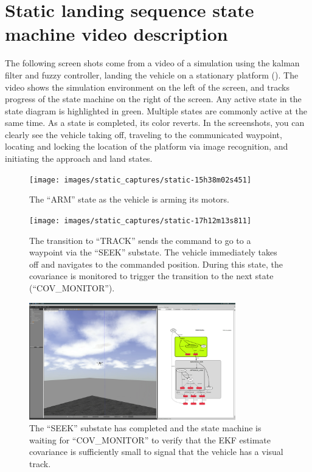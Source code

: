 \chapter{Static landing sequence state machine video description}\label{app:smach}
The following screen shots come from a video of a simulation using the kalman filter and fuzzy controller,
landing the vehicle on a stationary platform (). The
video shows the simulation environment on the left of the screen, and tracks progress of the
state machine on the right of the screen.  Any active state in the state diagram is highlighted in green.
Multiple states are commonly active at the same time. As a state is completed, its color reverts. In the
screenshots, you can clearly see the vehicle taking off, traveling to the communicated waypoint, locating and
locking the location of the platform via image recognition, and initiating the approach and land states.

\begin{figure}
    \centering
    \texttt{[image: images/static\_captures/static-15h38m02s451]}
    \caption{The ``ARM'' state as the vehicle is arming its motors.}\label{f:smach_arm}
\end{figure}


\begin{figure}
    \centering
    \texttt{[image: images/static\_captures/static-17h12m13s811]}
    \caption{The transition to ``TRACK'' sends the command to go to a waypoint via the ``SEEK'' substate. The
        vehicle immediately takes off and navigates to the commanded position. During this state, the
        covariance is monitored to trigger the transition to the next state
    (``COV\_MONITOR'').}\label{f:smach_track}
\end{figure}

\begin{figure}
    \centering
    \includegraphics[width=0.8\textwidth]{images/static_captures/static-15h39m11s782}
    \caption{The ``SEEK'' substate has completed and the state machine is waiting for ``COV\_MONITOR'' to
        verify that the EKF estimate covariance is sufficiently small to signal that the vehicle has a visual
    track.}\label{f:smach_covmon}
\end{figure}

